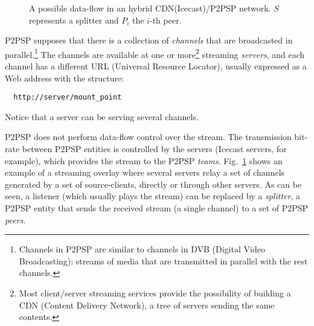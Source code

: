 
\label{sec:LBS}

\begin{figure}
   \caption{A possible data-flow in an
  hybrid CDN(Icecast)/P2PSP network. $S$ represents a splitter and $P_i$ the $i$-th
  peer.\label{fig:icecast-P2PSP}}
\end{figure}

P2PSP supposes that there is a collection of \emph{channels} that are
broadcasted in parallel.\footnote{Channels in P2PSP are
  similar to channels in DVB (Digital Video Broadcasting): streams of
  media that are transmitted in parallel with the rest channels.} The
channels are available at one or more\footnote{Most client/server
  streaming services provide the possibility of building a CDN
  (Content Delivery Network), a tree of servers sending the
  same contents.} streaming \emph{servers}, and each channel has a
different URL (Universal Resource Locator), usually expressed as a
Web address with the structure:
\begin{verbatim}
  http://server/mount_point
\end{verbatim}
Notice that a server can be serving several channels.

P2PSP does not perform data-flow control over the stream. The
transmission bit-rate between P2PSP entities is controlled by the
servers (Icecast servers, for example), which provides the stream to
the P2PSP \emph{teams}. Fig.~\ref{fig:icecast-P2PSP} shows an example
of a streaming overlay where several servers relay a set of channels
generated by a set of source-clients, directly or through other
servers. As can be seen, a listener (which usually plays the stream)
can be replaced by a \emph{splitter}, a P2PSP entity that sends the
received stream (a single channel) to a set of P2PSP \emph{peers}.



